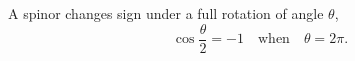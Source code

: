 \documentclass{article}
\begin{document}
A spinor changes sign under a full rotation of angle $\theta$,
\begin{equation}
\cos\frac{\theta}{2} = -1 \quad \text{when} \quad \theta = 2\pi .
\label{eq:full}
\end{equation}
\end{document}
